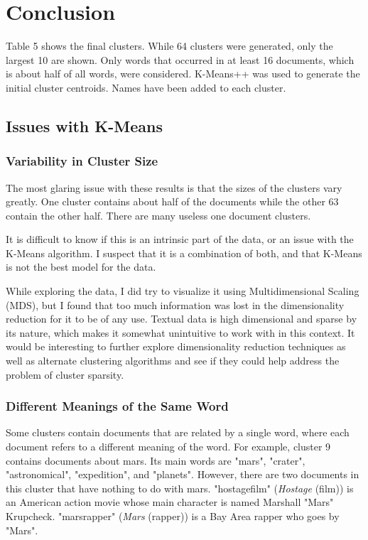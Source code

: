\documentclass{article} %
\begin{document}
\section{Conclusion}

Table 5 shows the final clusters. While 64 clusters were generated, only the largest 10 are shown. Only words that occurred in at least 16 documents, which is about half of all words, were considered. K-Means++ was used to generate the initial cluster centroids. Names have been added to each cluster.
 
\subsection{Issues with K-Means}

\subsubsection{Variability in Cluster Size}

The most glaring issue with these results is that the sizes of the clusters vary greatly. One cluster contains about half of the documents while the other 63 contain the other half. There are many useless one document clusters.

It is difficult to know if this is an intrinsic part of the data, or an issue with the K-Means algorithm. I suspect that it is a combination of both, and that K-Means is not the best model for the data.

While exploring the data, I did try to visualize it using Multidimensional Scaling (MDS), but I found that too much information was lost in the dimensionality reduction for it to be of any use. Textual data is high dimensional and sparse by its nature, which makes it somewhat unintuitive to work with in this context. It would be interesting to further explore dimensionality reduction techniques as well as alternate clustering algorithms and see if they could help address the problem of cluster sparsity.

\subsubsection{Different Meanings of the Same Word}

Some clusters contain documents that are related by a single word, where each document refers to a different meaning of the word. For example, cluster 9 contains documents about mars. Its main words are "mars", "crater", "astronomical", "expedition", and "planets". However, there are two documents in this cluster that have nothing to do with mars. "hostagefilm" (\textit{Hostage} (film)) is an American action movie whose main character is named Marshall "Mars" Krupcheck. "marsrapper" (\textit{Mars} (rapper)) is a Bay Area rapper who goes by "Mars".
\end{document}
